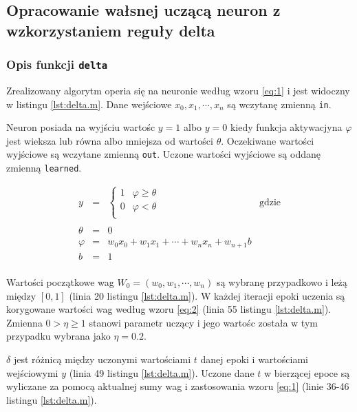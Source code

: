 \documentclass[pointlessnumbers, abstracton, headsepline, a4paper]{scrartcl}
\begin{document}
\subsection{Opracowanie wałsnej uczącą neuron z wzkorzystaniem reguły delta}
\subsubsection{Opis funkcji \texttt{delta}}
Zrealizowany algorytm operia się na neuronie według wzoru \ref{eq:1} i jest widoczny w listingu \ref{lst:delta.m}. Dane wejściowe $x_0, x_1, \cdots, x_n$ są wczytanę zmienną \texttt{in}.

Neuron posiada na wyjściu wartośc $y=1$ albo $y=0$ kiedy funkcja aktywacjyna $\varphi$ jest wieksza lub równa albo mniejsza od wartości $\theta$. Oczekiwane wartości wyjściowe są wczytane zmienną \texttt{out}. Uczone wartości wyjściowe są oddanę zmienną \texttt{learned}.

\begin{equation}
\label{eq:1}
\begin{array}{rcll}
y & = & \left\{
    \begin{array}{lc}
        1 & \varphi \ge \theta \\
        0 & \varphi < \theta \\
    \end{array}
\right. & \textrm{gdzie} \\
\\
\theta & = & 0 \\
\varphi & = & w_0 x_0 + w_1 x_1 + \cdots + w_n x_n + w_{n+1} b \\
b & = & 1 \\
\end{array}
\end{equation}

Wartości początkowe wag $W_0 = (w_0, w_1, \cdots , w_n)$ są wybranę przypadkowo i leżą między $[0,1]$ (linia 20 listingu \ref{lst:delta.m}). W każdej iteracji epoki uczenia są korygowane wartości wag według wzoru \ref{eq:2} (linia 55 listingu \ref{lst:delta.m}). Zmienna $0 > \eta \ge 1$ stanowi parametr uczący i jego wartośc została w tym przypadku wybrana jako $\eta = 0.2$.

$\delta$ jest różnicą między uczonymi wartościami $t$ danej epoki i wartościami wejściowymi $y$ (linia 49 listingu \ref{lst:delta.m}). Uczone dane $t$ w bierzącej epoce są wyliczane za pomocą aktualnej sumy wag i zastosowania wzoru \ref{eq:1} (linie 36-46 listingu \ref{lst:delta.m}).
\end{document}
